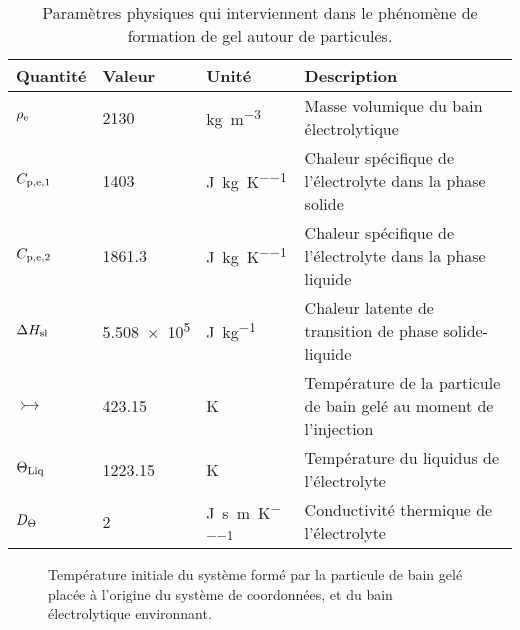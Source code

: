 \begin{table}
  \begin{center}
    \caption{Paramètres physiques qui interviennent dans le
      phénomène de formation de gel autour de particules.}
    \label{tab:freeze-physical-parameters}
    \begin{tabularx}{\textwidth}{@{}lllX@{}}
      \toprule
      Quantité              & Valeur       & Unité                                       & Description \\
      \midrule
      $\rho_\mathrm{e}$ & \num{2130}    & \si{\kg\per\cubic\meter}                    & Masse volumique du bain électrolytique \\
      $C_{\mathrm{p,e,1}}$     & \num{1403}    & \si{\joule\per\kilo\gram\per\kelvin}        & Chaleur spécifique de l'électrolyte dans la phase solide \\
      $C_{\mathrm{p,e,2}}$     & \num{1861.3}  & \si{\joule\per\kilo\gram\per\kelvin}        & Chaleur spécifique de l'électrolyte dans la phase liquide \\
      $\Delta H_\mathrm{sl}$     & \num{5.508e5} & \si{\joule\per\kilo\gram}                   & Chaleur latente de transition de phase solide-liquide \\
      $\tinj$               & \num{423.15}  & \si{\kelvin}                                & Température de la particule de bain gelé au moment de l'injection \\
      $\Theta_\text{Liq}$               & \num{1223.15}  & \si{\kelvin}                                & Température du liquidus de l'électrolyte \\
      $D_\Theta$   & \num{2}     & \si{\joule\per\second\per\meter\per\kelvin} & Conductivité thermique de l'électrolyte \\
      \bottomrule
    \end{tabularx}
\end{center}
\end{table}


\begin{figure}[!h]
  \begin{center}
    
    \caption{Température initiale du système formé par la particule de
      bain gelé placée à l'origine du système de coordonnées, et du
      bain électrolytique environnant.}
    \label{fig:particle-initial-temperature}
  \end{center}
\end{figure}

